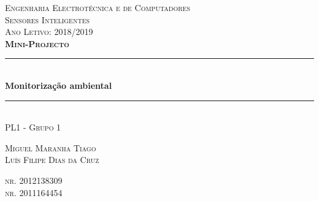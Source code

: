 \documentclass[12pt]{article}
\newcommand{\HRule}{\rule{\linewidth}{0.5mm}} %
\begin{document}
\begin{titlepage}
\pagestyle{fancy}
\renewcommand{\headrulewidth}{0pt}
\renewcommand{\footrulewidth}{0pt}
\setlength\headheight{150.8pt}
\addtolength{\textheight}{-20.0pt}


\center %
\vspace*{1cm}
\textsc{\Large Engenharia Electrotécnica e de Computadores}\\[1.5cm] %
\textsc{\LARGE Sensores Inteligentes}\\[0.15cm] %
\textsc{\large Ano Letivo: 2018/2019}\\[2cm]
\textsc{\LARGE \textbf{Mini-Projecto}  }\\[1cm]
\HRule \\[0.6cm]
{ \huge \bfseries Monitorização ambiental}\\[0.3cm]
\HRule \\[0.4cm]
\vspace{2cm}
\textsc{\large PL1 - Grupo 1}\\
\vspace{0.5cm}
\begin{minipage}{0.4\textwidth}
\begin{flushleft} \large
\textsc{Miguel Maranha Tiago}\\
\textsc{Luís Filipe Dias da Cruz}\\
\end{flushleft}
\end{minipage}
\begin{minipage}{0.4\textwidth}
\begin{flushright} \large
\textsc{nr. 2012138309}\\
\textsc{nr. 2011164454}\\
\end{flushright}
\end{minipage}
\thispagestyle{fancy}
\vfill
\end{titlepage}
\end{document}

